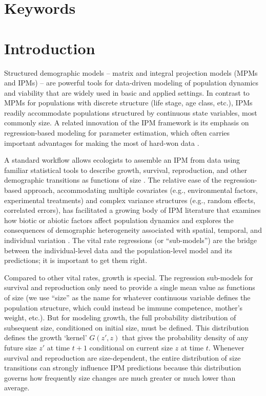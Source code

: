 \documentclass[12pt]{article}
\begin{document}
\section*{Keywords}

\newpage
\section*{Introduction}

Structured demographic models -- matrix and integral projection models (MPMs and IPMs) -- are powerful tools for data-driven modeling of population dynamics and viability that are widely used in basic and applied settings. 
In contrast to MPMs for populations with discrete structure (life stage, age class, etc.), IPMs \citep{easterling2000size} readily accommodate populations structured by continuous state variables, most commonly size. 
A related innovation of the IPM framework is its emphasis on regression-based modeling for parameter estimation, which 
often carries important advantages for making the most of hard-won data \citep{ellner2022critical}.  

A standard workflow allows ecologists to assemble an IPM from data using familiar statistical tools to describe growth, survival, reproduction, and other demographic transitions as functions of size \citep{Coulson:2012fk,ellner-etal-2016}. 
The relative ease of the regression-based approach, accommodating multiple covariates (e.g., environmental factors, experimental treatments) and complex variance structures (e.g., random effects, correlated errors), has facilitated a growing body of IPM literature that examines how biotic or abiotic factors affect population dynamics \citep[e.g.,][]{schultz2017native,ozgul2010coupled,louthan2022climate} and explores the consequences of demographic heterogeneity associated with spatial, temporal, and individual variation \citep[e.g.,][]{crone2016contrasting,compagnoni2016effect,plard2018sex}. 
The vital rate regressions (or ``sub-models'') are the bridge between the individual-level data and the population-level model and its predictions; it is important to get them right.

Compared to other vital rates, growth is special. 
The regression sub-models for survival and reproduction only need to provide a single mean value as functions of size (we use ``size'' as the name for whatever continuous variable defines the population structure, which could instead be immune competence, mother's weight, etc.).   
But for modeling growth, the full probability distribution of subsequent size, conditioned on initial size, must be defined. 
This distribution defines the growth `kernel' $G(z',z)$ that gives the probability density of any future size $z'$ at time $t+1$ conditional on current size $z$ at time $t$. 
Whenever survival and reproduction are size-dependent, the entire distribution of size transitions can strongly influence IPM predictions because this distribution governs how frequently size changes are much greater or much lower than average. 
\end{document}
